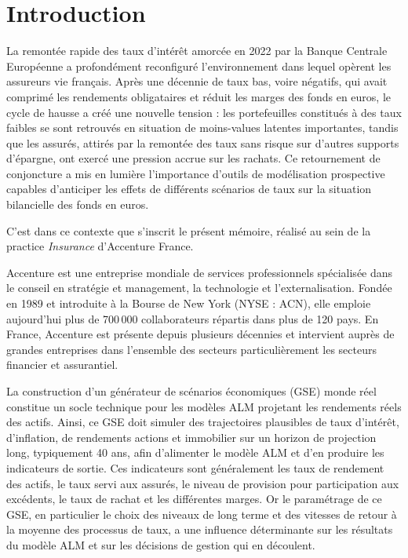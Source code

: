 \chapter*{Introduction}



La remontée rapide des taux d'intérêt amorcée en 2022 par la Banque Centrale Européenne a profondément reconfiguré l'environnement dans lequel opèrent les assureurs vie français. Après une décennie de taux bas, voire négatifs, qui avait comprimé les rendements obligataires et réduit les marges des fonds en euros, le cycle de hausse a créé une nouvelle tension : les portefeuilles constitués à des taux faibles se sont retrouvés en situation de moins-values latentes importantes, tandis que les assurés, attirés par la remontée des taux sans risque sur d'autres supports d'épargne, ont exercé une pression accrue sur les rachats. Ce retournement de conjoncture a mis en lumière l'importance d'outils de modélisation prospective capables d'anticiper les effets de différents scénarios de taux sur la situation bilancielle des fonds en euros.

C'est dans ce contexte que s'inscrit le présent mémoire, réalisé au sein de la practice \textit{Insurance} d'Accenture France.

Accenture est une entreprise mondiale de services professionnels spécialisée dans le conseil en stratégie et management, la technologie et l'externalisation. Fondée en 1989 et introduite à la Bourse de New York (NYSE : ACN), elle emploie aujourd'hui plus de 700\,000 collaborateurs répartis dans plus de 120 pays. En France, Accenture est présente depuis plusieurs décennies et intervient auprès de grandes entreprises dans l'ensemble des secteurs particulièrement les secteurs financier et assurantiel.

La construction d'un générateur de scénarios économiques (GSE) monde réel constitue un socle technique pour les modèles ALM projetant les rendements réels des actifs. Ainsi, ce GSE doit simuler des trajectoires plausibles de taux d'intérêt, d'inflation, de rendements actions et immobilier sur un horizon de projection long, typiquement 40 ans, afin d'alimenter le modèle ALM et d'en produire les indicateurs de sortie. Ces indicateurs sont généralement les taux de rendement des actifs, le taux servi aux assurés, le niveau de provision pour participation aux excédents, le taux de rachat et les différentes marges. Or le paramétrage de ce GSE, en particulier le choix des niveaux de long terme et des vitesses de retour à la moyenne des processus de taux, a une influence déterminante sur les résultats du modèle ALM et sur les décisions de gestion qui en découlent.

